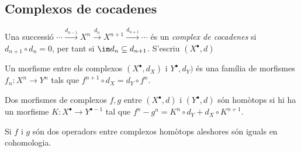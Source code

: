 \documentclass[12pt,twocolumn]{article}
\begin{document}
\subsection{Complexos de cocadenes}
\begin{definition}
	Una successió \( \cdots \xrightarrow{d_{n-1}} X^n \xrightarrow{d_{n}} X^{n+1}
	\xrightarrow{d_{n+1}}	\cdots \) és un \emph{complex de cocadenes} si \( d_{n+1} \circ
	d_n = 0 \), per tant si \( \im d_n \subseteq d_{n+1} \). S'escriu \( (X^\bullet, d) \)
\end{definition}

\begin{definition}
	Un morfisme entre els complexos \( (X^\bullet, d_X) \) i \( Y^\bullet, d_Y) \) és una
	família de morfismes \( f_n \colon X^n \to Y^n \) tals que \( f^{n+1} \circ d_X = d_Y
	\circ f^n	\). 
\end{definition}

\begin{definition}
	Dos morfismes de complexos \( f, g \) entre \( (X^\bullet,d) \) i \( (Y^\bullet, d) \)
	són homòtops si hi ha un morfisme \( K \colon X^\bullet \to Y^{\bullet -1} \) tal que \(
	f^n - g^n = K^n \circ d_Y + d_X \circ K^{n+1} \). 
\end{definition}

\begin{proposition}
	Si \( f \) i \( g \) són dos operadors entre complexos homòtops aleshores són iguals en
	cohomologia. 
\end{proposition}
\end{document}
